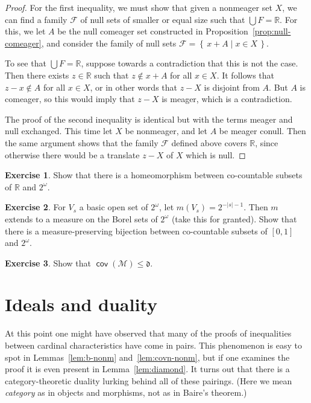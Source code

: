 \documentclass[11pt,oneside]{amsbook}
\newcommand{\set}[1]{\left\{\,#1\,\right\}}
\newcommand{\RR}{\mathbb R}
\newcommand{\Meager}{\mathcal M}
\DeclareMathOperator{\cov}{\mathsf{cov}}
\theoremstyle{definition}
\newtheorem{exerc}{Exercise}[section]
\theoremstyle{plain}
\theoremstyle{definition}
\theoremstyle{remark}
\numberwithin{equation}{section}
\numberwithin{figure}{section}
\begin{document}
\begin{proof}
  For the first inequality, we must show that given a nonmeager set $X$, we can find a family $\mathcal F$ of null sets of smaller or equal size such that $\bigcup F=\RR$. For this, we let $A$ be the null comeager set constructed in Proposition~\ref{prop:null-comeager}, and consider the family of null sets $\mathcal F=\set{x+A\mid x\in X}$.

  To see that $\bigcup F=\RR$, suppose towards a contradiction that this is not the case. Then there exists $z\in\RR$ such that $z\notin x+A$ for all $x\in X$. It follows that $z-x\notin A$ for all $x\in X$, or in other words that $z-X$ is disjoint from $A$. But $A$ is comeager, so this would imply that $z-X$ is meager, which is a contradiction.

  The proof of the second inequality is identical but with the terms meager and null exchanged. This time let $X$ be nonmeager, and let $A$ be meager conull. Then the same argument shows that the family $\mathcal F$ defined above covers $\RR$, since otherwise there would be a translate $z-X$ of $X$ which is null.
\end{proof}

\begin{exerc}
  \label{exerc:meager-bij}
  Show that there is a homeomorphism between co-countable subsets of $\RR$ and $2^\omega$.
\end{exerc}

\begin{exerc}
  \label{exerc:null-bij}
  For $V_s$ a basic open set of $2^\omega$, let $m(V_s)=2^{-|s|-1}$. Then $m$ extends to a measure on the Borel sets of $2^\omega$ (take this for granted). Show that there is a measure-preserving bijection between co-countable subsets of $[0,1]$ and $2^\omega$.
\end{exerc}

\begin{exerc}
  \label{exerc:covm-d}
  Show that $\cov(\Meager)\leq\mathfrak d$.
\end{exerc}



\section{Ideals and duality}

At this point one might have observed that many of the proofs of inequalities between cardinal characteristics have come in pairs. This phenomenon is easy to spot in Lemmas~\ref{lem:b-nonm} and~\ref{lem:covn-nonm}, but if one examines the proof it is even present in Lemma~\ref{lem:diamond}. It turns out that there is a category-theoretic duality lurking behind all of these pairings. (Here we mean \emph{category} as in objects and morphisms, not as in Baire's theorem.)
\end{document}
